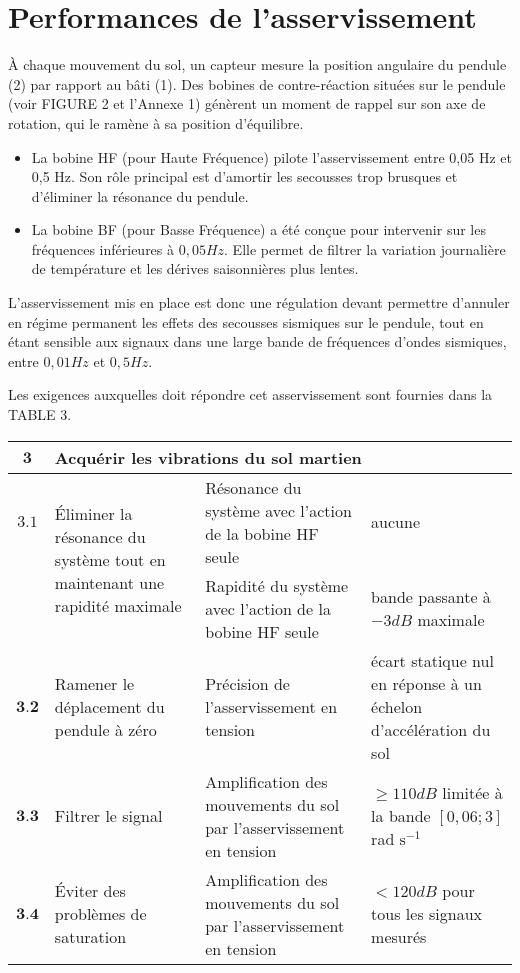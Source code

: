 \section{Performances de l'asservissement}
À chaque mouvement du sol, un capteur mesure la position angulaire du pendule (2) par rapport au bâti (1). Des bobines de contre-réaction situées sur le pendule (voir FIGURE 2 et l'Annexe 1) génèrent un moment de rappel sur son axe de rotation, qui le ramène à sa position d'équilibre.

\begin{itemize}
  \item La bobine HF (pour Haute Fréquence) pilote l'asservissement entre 0,05 Hz et 0,5 Hz. Son rôle principal est d'amortir les secousses trop brusques et d'éliminer la résonance du pendule.
  \item La bobine BF (pour Basse Fréquence) a été conçue pour intervenir sur les fréquences inférieures à $0,05 \si{Hz}$. Elle permet de filtrer la variation journalière de température et les dérives saisonnières plus lentes.
\end{itemize}

L'asservissement mis en place est donc une régulation devant permettre d'annuler en régime permanent les effets des secousses sismiques sur le pendule, tout en étant sensible aux signaux dans une large bande de fréquences d'ondes sismiques, entre $0,01 \si{Hz}$ et $0,5 \si{Hz}$.

Les exigences auxquelles doit répondre cet asservissement sont fournies dans la TABLE 3.

\begin{center}
\begin{tabular}{cp{4cm}p{4cm}p{4cm}}
\hline
$\mathbf{3}$ & \multicolumn{3}{l}{Acquérir les vibrations du sol martien}  \\
\hline
$\mathbf{3.1}$ &\multirow{2}{4cm}{Éliminer la résonance du système tout en maintenant une rapidité maximale}&
Résonance du système avec l'action de la bobine HF seule &  aucune \\
\cline { 3 - 4 }
& & Rapidité du système avec l'action de la bobine HF seule & bande passante à $-3 \si{dB}$ maximale \\
\hline
$\mathbf{3 . 2}$ & 
Ramener le déplacement du pendule à zéro 
& Précision de l'asservissement en tension & écart statique nul en réponse à un échelon d'accélération du sol \\
\hline
$\mathbf{3 . 3}$ & Filtrer le signal & Amplification des mouvements du sol par l'asservissement en tension & 
$\geq 110 \si{dB}$ limitée à la bande $[0,06 ; 3]$ \si{rad} $\mathrm{s}^{-1}$ \\
\hline
$\mathbf{3 . 4}$ & Éviter des problèmes de saturation & Amplification des mouvements du sol par l'asservissement en tension 
&$<120 \si{dB}$ pour tous les signaux mesurés \\
\hline
\end{tabular}
\end{center}

